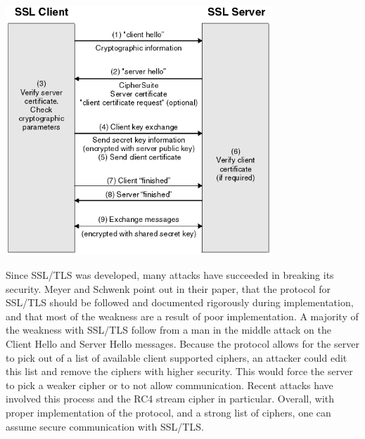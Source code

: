\begin{center}
    \includegraphics[width=0.75\textwidth]{SSL_TLS_Diagram.png}
\end{center}

Since SSL/TLS was developed, many attacks have succeeded in breaking its
security.  Meyer and Schwenk point out in their paper, that the protocol for
SSL/TLS should be followed and documented rigorously during implementation, and
that most of the weakness are a result of poor implementation\cite[p.
14]{mayer}.  A majority of the weakness with SSL/TLS follow from a man in the
middle attack on the Client Hello and Server Hello messages.  Because the
protocol allows for the server to pick out of a list of available client
supported ciphers, an attacker could edit this list and remove the ciphers with
higher security.  This would force the server to pick a weaker cipher or to not
allow communication.  Recent attacks have involved this process and the RC4
stream cipher in particular.  Overall, with proper implementation of the
protocol, and a strong list of ciphers,  one can assume secure communication
with SSL/TLS.

